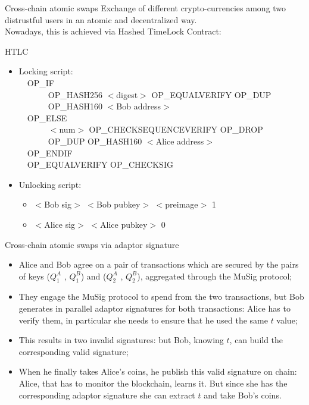 \documentclass[slidescentered]{beamer}
\begin{document}
	\begin{frame}{Cross-chain atomic swaps}
		Exchange of different crypto-currencies among two distrustful users in an atomic and decentralized way.
		\\
		Nowadays, this is achieved via Hashed TimeLock Contract:
		\begin{block}{HTLC}
			\begin{itemize}
				\item Locking script: \\
				\ \ OP\_IF
				\\
				\ \ \ \ \ \ \ OP\_HASH256 $<$digest$>$ OP\_EQUALVERIFY OP\_DUP \\ 
				\ \ \ \ \ \ \ OP\_HASH160 $<$Bob address$>$ \\
				\ \ OP\_ELSE \\
				\ \ \ \ \ \ \ $<$num$>$ OP\_CHECKSEQUENCEVERIFY OP\_DROP \\ 
				\ \ \ \ \ \ \ OP\_DUP OP\_HASH160 $<$Alice address$>$ \\
				\ \ OP\_ENDIF \\
				\ \ OP\_EQUALVERIFY OP\_CHECKSIG
				\item Unlocking script:
				\begin{itemize}
					\item $<$Bob sig$>$ $<$Bob pubkey$>$ $<$preimage$>$ 1
					\item $<$Alice sig$>$ $<$Alice pubkey$>$ 0
				\end{itemize}
			\end{itemize}
		\end{block}
	\end{frame}

	\begin{frame}{Cross-chain atomic swaps via adaptor signature}
		\begin{itemize}
		\item Alice and Bob agree on a pair of transactions which are secured by the pairs of keys ($Q^A_1$ , $Q^B_1$) and ($Q^A_2$ , $Q^B_2$), aggregated through the MuSig protocol;
		\item They engage the MuSig protocol to spend from the two transactions, but Bob generates in parallel adaptor signatures for both transactions: Alice has to verify them, in particular she needs to ensure that he used the same $t$ value;
		\item This results in two invalid signatures: but Bob, knowing $t$, can build the corresponding valid signature;
		\item When he finally takes Alice's coins, he publish this valid signature on chain: Alice, that has to monitor the blockchain, learns it. But since she has the corresponding adaptor signature she can extract $t$ and take Bob's coins.
		\end{itemize}
	\end{frame}
\end{document}
